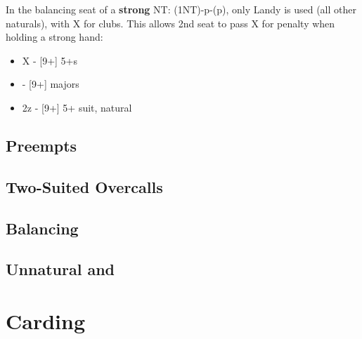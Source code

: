 \documentclass[12pt]{report}
\newcommand{\ul}[1]{\begin{itemize}#1\end{itemize}}
\newcommand{\li}{\item[~]}
\newcommand{\bidsection}[2]{\section{\texorpdfstring{#1}{#2}}}
\begin{document}
    In the balancing seat of a \textbf{strong} NT: (1NT)-p-(p), only Landy is used (all other naturals), with X for clubs.  This allows 2nd seat to pass X for penalty when holding a strong hand:
    \ul {
        \li X - [9+] 5+\cl{}s
        \li {} - [9+] majors
        \li 2z - [9+] 5+ suit, natural
    }
\newpage

\section{Preempts} \label{4:5}
\section{Two-Suited Overcalls} \label{4:6}
\section{Balancing} \label{4:7}
\bidsection{Unnatural  and }{Unnatural 1♣ and 1♢} \label{4:8}



\chapter{Carding}
\end{document}
